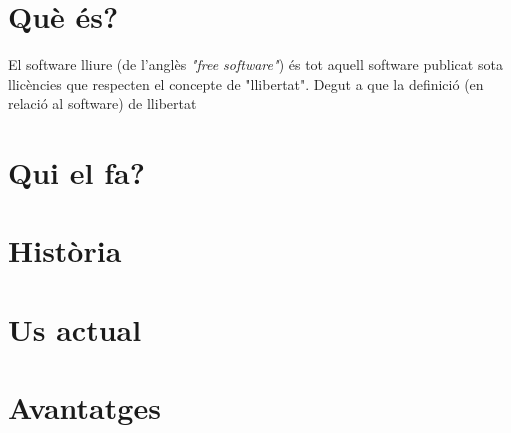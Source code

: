 \section{Què és?}

El software lliure (de l'anglès \emph{"free software"}) és tot aquell software publicat
sota llicències que respecten el concepte de "llibertat". Degut a que la definició
(en relació al software) de llibertat

\section{Qui el fa?}

\section{Història}

\section{Us actual}

\section{Avantatges}
